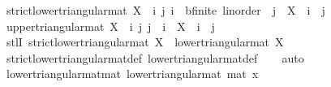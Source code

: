 \begin{isabellebody}
\isanewline
{}\isamarkupfalse%
\ {\isachardoublequoteopen}strict{\isacharunderscore}{\kern0pt}lower{\isacharunderscore}{\kern0pt}triangular{\isacharunderscore}{\kern0pt}mat\ X\ {\isasymlongleftrightarrow}\ {\isacharparenleft}{\kern0pt}{\isasymforall}i\ j{\isachardot}{\kern0pt}\ {\isacharparenleft}{\kern0pt}i\ {\isacharcolon}{\kern0pt}{\isacharcolon}{\kern0pt}\ {\isacharprime}{\kern0pt}b{\isacharcolon}{\kern0pt}{\isacharcolon}{\kern0pt}{\isacharbraceleft}{\kern0pt}finite{\isacharcomma}{\kern0pt}\ linorder{\isacharbraceright}{\kern0pt}{\isacharparenright}{\kern0pt}\ {\isasymle}\ j\ {\isasymlongrightarrow}\ X\ {\isachardollar}{\kern0pt}\ i\ {\isachardollar}{\kern0pt}\ j\ {\isacharequal}{\kern0pt}\ {}{\isacharparenright}{\kern0pt}{\isachardoublequoteclose}\isanewline
\isanewline
{}\isamarkupfalse%
\ {\isachardoublequoteopen}upper{\isacharunderscore}{\kern0pt}triangular{\isacharunderscore}{\kern0pt}mat\ X\ {\isasymlongleftrightarrow}\ {\isacharparenleft}{\kern0pt}{\isasymforall}i\ j{\isachardot}{\kern0pt}\ j\ {\isacharless}{\kern0pt}\ i\ {\isasymlongrightarrow}\ X\ {\isachardollar}{\kern0pt}\ i\ {\isachardollar}{\kern0pt}\ j\ {\isacharequal}{\kern0pt}\ {}{\isacharparenright}{\kern0pt}{\isachardoublequoteclose}\isanewline
\isanewline
{}\isamarkupfalse%
\ stlI{\isacharcolon}{\kern0pt}\ {\isachardoublequoteopen}strict{\isacharunderscore}{\kern0pt}lower{\isacharunderscore}{\kern0pt}triangular{\isacharunderscore}{\kern0pt}mat\ X\ {\isasymLongrightarrow}\ lower{\isacharunderscore}{\kern0pt}triangular{\isacharunderscore}{\kern0pt}mat\ X{\isachardoublequoteclose}\isanewline
%
\isadelimproof
\ \ %
\endisadelimproof
%
\isatagproof
{}\isamarkupfalse%
\ strict{\isacharunderscore}{\kern0pt}lower{\isacharunderscore}{\kern0pt}triangular{\isacharunderscore}{\kern0pt}mat{\isacharunderscore}{\kern0pt}def\ lower{\isacharunderscore}{\kern0pt}triangular{\isacharunderscore}{\kern0pt}mat{\isacharunderscore}{\kern0pt}def\isanewline
\ \ \isamarkupfalse%
\ auto%
\endisatagproof
{\isafoldproof}%
%
\isadelimproof
\isanewline
%
\endisadelimproof
\isanewline
{}\isamarkupfalse%
\ lower{\isacharunderscore}{\kern0pt}triangular{\isacharunderscore}{\kern0pt}mat{\isacharunderscore}{\kern0pt}mat{\isacharcolon}{\kern0pt}\ {\isachardoublequoteopen}lower{\isacharunderscore}{\kern0pt}triangular{\isacharunderscore}{\kern0pt}mat\ {\isacharparenleft}{\kern0pt}mat\ x{\isacharparenright}{\kern0pt}{\isachardoublequoteclose}\isanewline
%
\isadelimproof
\ \ %
\endisadelimproof

\end{isabellebody}
